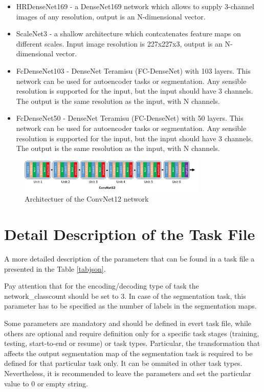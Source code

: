 \documentclass[a4paper, 11pt]{article}
\begin{document}
\begin{itemize}
    \item HRDenseNet169 - a DenseNet169 network which allows to supply 3-channel images of any resolution, output is an N-dimensional vector. 
    \item ScaleNet3 - a shallow architecture which contcatenates feature maps on different scales. Input image resolution is 227x227x3, output is an N-dimensional vector.
    \item FcDenseNet103 - DenseNet Teramisu (FC-DenseNet) with 103 layers. This network can be used for autoencoder tasks or segmentation. Any sensible resolution is supported for the input, but the input should have 3 channels. The output is the same resolution as the input, with N channels.
    \item FcDenseNet50 - DenseNet Teramisu (FC-DenseNet) with 50 layers. This network can be used for autoencoder tasks or segmentation. Any sensible resolution is supported for the input, but the input should have 3 channels. The output is the same resolution as the input, with N channels.

\end{itemize}

\begin{figure}
    \centering
    \includegraphics[width=0.8\textwidth]{img/convnet12.png}
    \caption{Architectuer of the ConvNet12 network}
    \label{convnet12}
\end{figure}


\section{Detail Description of the Task File}
A more detailed description of the parameters that can be found in a task file a presented in the Table \ref{tabjson}.

Pay attention that for the encoding/decoding type of task the network\_classcount should be set to 3. In case of the segmentation task, this parameter has to be specified as the number of labels in the segmentation maps.

Some parameters are mandatory and should be defined in evert task file, while others are optional and require definition only for a specific task stages (training, testing, start-to-end or resume) or task types. Particular, the transformation that affects the output segmentation map of the segmentation task is required to be defined for that particular task only. It can be ommited in other task types. Nevertheless, it is recommended to leave the parameters and set the particular value to
0 or empty string.
\end{document}
